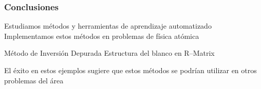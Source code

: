 \documentclass[14pt,compress]{beamer}
\begin{document}
\begin{frame}
\frametitle{Conclusiones}

\begin{itemize}[<+-| alert@+>]
\itemb Estudiamos métodos y herramientas de aprendizaje automatizado
\vspace{0.2cm}
\itemb Implementamos estos métodos en problemas de física atómica
\vspace{0.2cm}
\begin{itemize}
  \itemb Método de Inversión Depurada
\vspace{0.2cm}
  \itemb Estructura del blanco en R--Matrix
\end{itemize}
\itemb El éxito en estos ejemplos sugiere que estos métodos se podrían 
utilizar en otros problemas del área
\vspace{0.2cm}
\end{itemize}

\end{frame}
\end{document}
